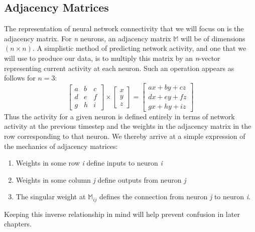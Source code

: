 \subsection{Adjacency Matrices}
\label{subsec:adjacency}
The representation of neural network connectivity that we will focus on is the 
adjacency matrix. For \textit{n} neurons, an adjacency matrix $\mathbb{M}$ will 
be of dimensions $(n \times n)$. A simplistic method of predicting network 
activity, and one that we will use to produce our data, is to multiply this 
matrix by an \textit{n}-vector representing current activity at each neuron.  
Such an operation appears as follows for $n=3$:
\[ \begin{bmatrix}
		a & b & c\\
		d & e & f\\
		g & h & i
	\end{bmatrix}
	\times
	\begin{bmatrix}
		x\\
		y\\
		z
	\end{bmatrix}
	=
	\begin{bmatrix}
		ax + by + cz\\
		dx + ey + fz\\
		gx + hy + iz
	\end{bmatrix}
\]
Thus the activity for a given neuron is defined entirely in terms of network 
activity at the previous timestep and the weights in the adjacency matrix in the 
row corresponding to that neuron. We thereby arrive at a simple expression of 
the mechanics of adjacency matrices: 

\begin{enumerate}
	\item Weights in some row \textit{i} define inputs to neuron \textit{i}
	\item Weights in some column \textit{j} define outputs from neuron 
		\textit{j}
	\item The singular weight at $\mathbb{M}_{ij}$ defines the connection from 
		neuron \textit{j} to neuron \textit{i}.  
\end{enumerate}

Keeping this inverse relationship in mind will help prevent confusion in later 
chapters.
